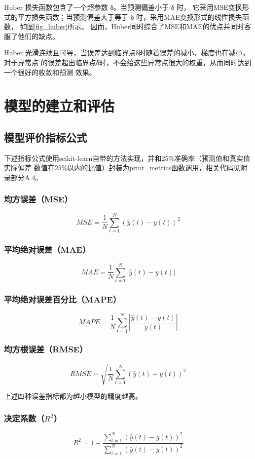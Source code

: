\documentclass[AutoFakeBold]{LZUThesis}
\begin{document}
Huber 损失函数\cite{huber1992robust}包含了一个超参数 δ。当预测偏差小于 δ 时，
它采用MSE变换形式的平方损失函数；当预测偏差大于等于 δ 时，采用MAE变换形式的线性损失函数，
如图\ref{fig_huber}所示。
因而，Huber同时综合了MSE和MAE的优点并同时客服了他们的缺点。

Huber 光滑连续且可导，当误差达到临界点δ时随着误差的减小，梯度也在减小，对于异常点
的误差超出临界点δ时，不会给这些异常点很大的权重，从而同时达到一个很好的收敛和预测
效果。

\chapter{模型的建立和评估}
\section{模型评价指标公式}
下述指标公式使用scikit-learn自带的方法实现，并和25\%准确率（预测值和真实值实际偏差
数值在25\%以内的比值）封装为print\_metrics函数调用，相关代码见附录部分A.4。

\subsection{均方误差（MSE）}
$$MSE=\frac{1}{N}\sum_{t=1}^{N}\left(\hat{y}\left(t\right)-y\left(t\right)\right)^2$$

\subsection{平均绝对误差（MAE）}
$$MAE=\frac{1}{N}\sum_{t=1}^{N}\left|\hat{y}\left(t\right)-y\left(t\right)\right|$$

\subsection{平均绝对误差百分比（MAPE）}
$$MAPE=\frac{1}{N}\sum_{t=1}^{N}\left|\frac{\hat{y}\left(t\right)-y\left(t\right)}{y\left(t\right)}\right|$$

\subsection{均方根误差（RMSE）}
$$RMSE=\sqrt{\frac{1}{N}\sum_{t=1}^{N}\left(\hat{y}\left(t\right)-y\left(t\right)\right)^2}$$

上述四种误差指标都为越小模型的精度越高。

\subsection{决定系数（$R^2$）}
$$R^2=1-\frac{\sum_{t=1}^{N}(\hat{y}\left(t\right)-y\left(t\right))^2}{\sum_{t=1}^{N}(\bar{y}\left(t\right)-y\left(t\right))^2}$$
\end{document}
